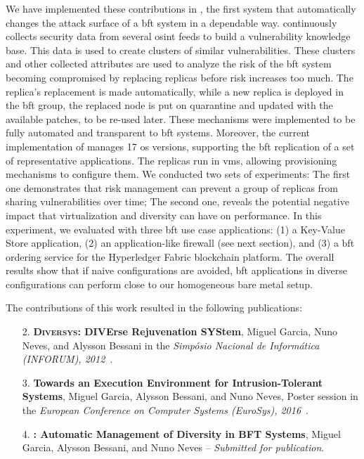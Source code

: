 We have implemented these contributions in \system, the first system that automatically changes the attack surface of a \gls{bft} system in a dependable way.
\system continuously collects security data from several \gls{osint} feeds to build a vulnerability knowledge base.
This data is used to create clusters of similar vulnerabilities.
These clusters and other collected attributes are used to analyze the risk of the \gls{bft} system becoming compromised by replacing replicas before risk increases too much. 
The replica's replacement is made automatically, while a new replica is deployed in the \gls{bft} group, the replaced node is put on quarantine and updated with the available patches, to be re-used later.
These mechanisms were implemented to be fully automated and transparent to \gls{bft} systems.
Moreover, the current implementation of \system manages 17 \gls{os} versions, supporting the \gls{bft} replication of a set of representative applications.
The replicas run in \glspl{vm}, allowing provisioning mechanisms to configure them. 
We conducted two sets of experiments: The first one demonstrates that \system risk management can prevent a group of replicas from sharing vulnerabilities over time; 
The second one, reveals the potential negative impact that virtualization and diversity can have on performance. 
In this experiment, we evaluated \system with three \gls{bft} use case applications: (1) a Key-Value Store application, (2) \sieveq an application-like firewall (see next section), and (3) a \gls{bft} ordering service for the Hyperledger Fabric blockchain platform.
The overall results show that if naive configurations are avoided, \gls{bft} applications in diverse configurations can perform close to our homogeneous bare metal setup.

The contributions of this work resulted in the following publications:

\begin{enumerate}

\item[2.] \textbf{\textsc{Diversys}: DIVErse Rejuvenation SYStem}, Miguel Garcia, Nuno Neves, and  Alysson Bessani in the \emph{Simp\'{o}sio Nacional de Inform\'{a}tica (INFORUM), 2012~\cite{Garcia:2012b}}.


\item[3.] \textbf{Towards an Execution Environment for Intrusion-Tolerant Systems}, Miguel Garcia, Alysson Bessani, and Nuno Neves, Poster session in the \emph{European Conference on Computer Systems (EuroSys), 2016}~\cite{Garcia:2016b}.


\item[4.] \textbf{\system: Automatic Management of Diversity in BFT Systems}, Miguel Garcia, Alysson Bessani, and Nuno Neves -- \emph{Submitted for publication}.

\end{enumerate}


